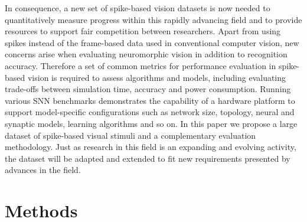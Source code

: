 In consequence, a new set of spike-based vision datasets is now needed to quantitatively measure progress within this rapidly advancing field and to provide resources to support fair competition between researchers.
Apart from using spikes instead of the frame-based data used in conventional computer vision, new concerns arise when evaluating neuromorphic vision in addition to recognition accuracy.
Therefore a set of common metrics for performance evaluation in spike-based vision is required to assess algorithms and models, including evaluating
trade-offs between simulation time, accuracy and power consumption.
Running various SNN benchmarks demonstrates the capability of a hardware platform to support model-specific configurations such as network size, topology, neural and synaptic models, learning algorithms and so on.
In this paper we propose a large dataset of spike-based visual stimuli and a complementary evaluation methodology.
Just as research in this field is an expanding and evolving activity, the dataset will be adapted and extended to fit new requirements presented by advances in the field.
\section{Methods}
\label{sec:method}
